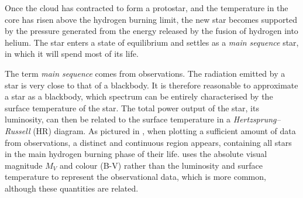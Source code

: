 %
%
%
%

Once the cloud has contracted to form a protostar, and the temperature in the core has risen above the hydrogen burning limit, the new star becomes supported by the pressure generated from the energy released by the fusion of hydrogen into helium. The star enters a state of equilibrium and settles as a \emph{main sequence} star, in which it will spend most of its life.

The term \emph{main sequence} comes from observations. The radiation emitted by a star is very close to that of a blackbody. It is therefore reasonable to approximate a star as a blackbody, which spectrum can be entirely characterised by the surface temperature of the star. The total power output of the star, its luminosity, can then be related to the surface temperature in a \emph{Hertzsprung–Russell} (HR) diagram. As pictured in , when plotting a sufficient amount of data from observations, a distinct and continuous region appears, containing all stars in the main hydrogen burning phase of their life.  uses the absolute visual magnitude \(M_V\) and colour (B-V) rather than the luminosity and surface temperature to represent the observational data, which is more common, although these quantities are related.

